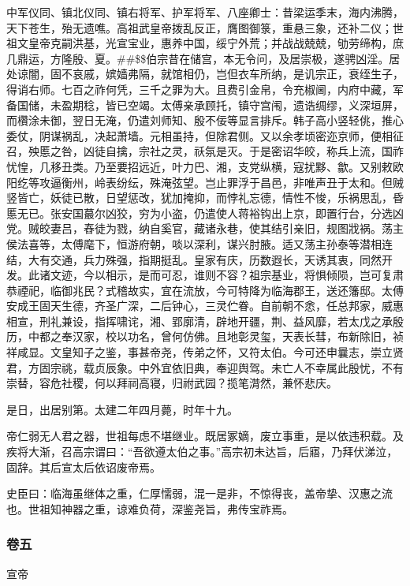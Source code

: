 \documentclass[]{article}
\begin{document}
中军仪同、镇北仪同、镇右将军、护军将军、八座卿士：昔梁运季末，海内沸腾，天下苍生，殆无遗噍。高祖武皇帝拨乱反正，膺图御箓，重悬三象，还补二仪；世祖文皇帝克嗣洪基，光宣宝业，惠养中国，绥宁外荒；并战战兢兢，劬劳缔构，庶几鼎运，方隆殷、夏。\#\#\$\$伯宗昔在储宫，本无令问，及居崇极，遂骋凶淫。居处谅闇，固不哀戚，嫔嫱弗隔，就馆相仍，岂但衣车所纳，是讥宗正，衰绖生子，得诮右师。七百之祚何凭，三千之罪为大。且费引金帛，令充椒阃，内府中藏，军备国储，未盈期稔，皆已空竭。太傅亲承顾托，镇守宫闱，遗诰绸缪，义深垣屏，而欑涂未御，翌日无淹，仍遣刘师知、殷不佞等显言排斥。韩子高小竖轻佻，推心委仗，阴谋祸乱，决起萧墙。元相虽持，但除君侧。又以余孝顷密迩京师，便相征召，殃慝之咎，凶徒自擒，宗社之灵，祅氛是灭。于是密诏华皎，称兵上流，国祚忧惶，几移丑类。乃至要招远近，叶力巴、湘，支党纵横，寇扰黟、歙。又别敕欧阳纥等攻逼衡州，岭表纷纭，殊淹弦望。岂止罪浮于昌邑，非唯声丑于太和。但贼竖皆亡，妖徒已散，日望惩改，犹加掩抑，而悖礼忘德，情性不悛，乐祸思乱，昏慝无已。张安国蕞尔凶狡，穷为小盗，仍遣使人蒋裕钩出上京，即置行台，分选凶党。贼皎妻吕，舂徒为戮，纳自奚官，藏诸永巷，使其结引亲旧，规图戕祸。荡主侯法喜等，太傅麾下，恒游府朝，啖以深利，谋兴肘腋。适又荡主孙泰等潜相连结，大有交通，兵力殊强，指期挺乱。皇家有庆，历数遐长，天诱其衷，同然开发。此诸文迹，今以相示，是而可忍，谁则不容？祖宗基业，将惧倾陨，岂可复肃恭禋祀，临御兆民？式稽故实，宜在流放，今可特降为临海郡王，送还籓邸。太傅安成王固天生德，齐圣广深，二后钟心，三灵伫眷。自前朝不悆，任总邦家，威惠相宣，刑礼兼设，指挥啸诧，湘、郢廓清，辟地开疆，荆、益风靡，若太戊之承殷历，中都之奉汉家，校以功名，曾何仿佛。且地彰灵玺，天表长彗，布新除旧，祯祥咸显。文皇知子之鉴，事甚帝尧，传弟之怀，又符太伯。今可还申曩志，崇立贤君，方固宗祧，载贞辰象。中外宜依旧典，奉迎舆驾。未亡人不幸属此殷忧，不有崇替，容危社稷，何以拜祠高寝，归祔武园？揽笔潸然，兼怀悲庆。

是日，出居别第。太建二年四月薨，时年十九。

帝仁弱无人君之器，世祖每虑不堪继业。既居冢嫡，废立事重，是以依违积载。及疾将大渐，召高宗谓曰：``吾欲遵太伯之事。''高宗初未达旨，后寤，乃拜伏涕泣，固辞。其后宣太后依诏废帝焉。

史臣曰：临海虽继体之重，仁厚懦弱，混一是非，不惊得丧，盖帝挚、汉惠之流也。世祖知神器之重，谅难负荷，深鉴尧旨，弗传宝祚焉。

\hypertarget{header-n4230}{%
\subsubsection{卷五}\label{header-n4230}}

宣帝
\end{document}
